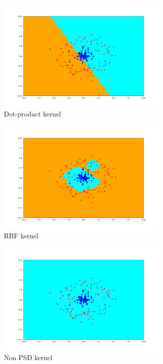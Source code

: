 \begin{answer}
    \begin{figure}[H]
        \centering
        \includegraphics[width=0.75\textwidth]{../src/perceptron/perceptron_dot_output.png}
        \caption{Dot-product kernel}
        \label{fig:dot-product}
    \end{figure}
    \begin{figure}[H]
        \centering
        \includegraphics[width=0.75\textwidth]{../src/perceptron/perceptron_rbf_output.png}
        \caption{RBF kernel}
        \label{fig:rbf}
    \end{figure}
    \begin{figure}[H]
        \centering
        \includegraphics[width=0.75\textwidth]{../src/perceptron/perceptron_non_psd_output.png}
        \caption{Non PSD kernel}
        \label{fig:non_psd}
    \end{figure}
\end{answer}
